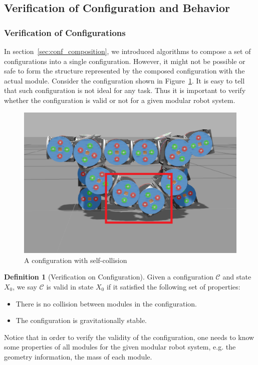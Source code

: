 \documentclass[conference]{IEEEtran}
\theoremstyle{definition}
\newtheorem{definition}{Definition}[section]
\begin{document}
\subsection{ Verification of Configuration and Behavior}

\subsubsection{Verification of Configurations}\label{sec:verify_conf} In section~\ref{sec:conf_composition}, we introduced algorithms to compose a set of configurations into a single configuration. However, it might not be possible  or safe to form the structure represented by the composed configuration with the actual module. Consider the configuration shown in Figure~\ref{fig:smores_conf_collision}. It is easy to tell that such configuration is not ideal for any task. Thus it is important to verify whether the configuration is valid or not for a given modular robot system.

\begin{figure}
\begin{center}
\includegraphics[width=0.5\columnwidth]{images/walkbot_collision.png}
\end{center}
\caption{A configuration with self-collision}
\label{fig:smores_conf_collision}
\end{figure}

\begin{definition}[Verification on Configuration]
Given a configuration $\mathcal{C}$ and state \(X_0\), we say $\mathcal{C}$ is valid in
state \(X_0\) if it satisfied the following set of properties:
\begin{itemize}
\item There is no collision between modules in the configuration.
\item The configuration is gravitationally stable.
\end{itemize}
Notice that in order to verify the validity of the configuration, one needs to know some properties of all modules for the given modular robot system, e.g. the geometry information, the mass of each module.
\end{definition}
\end{document}
